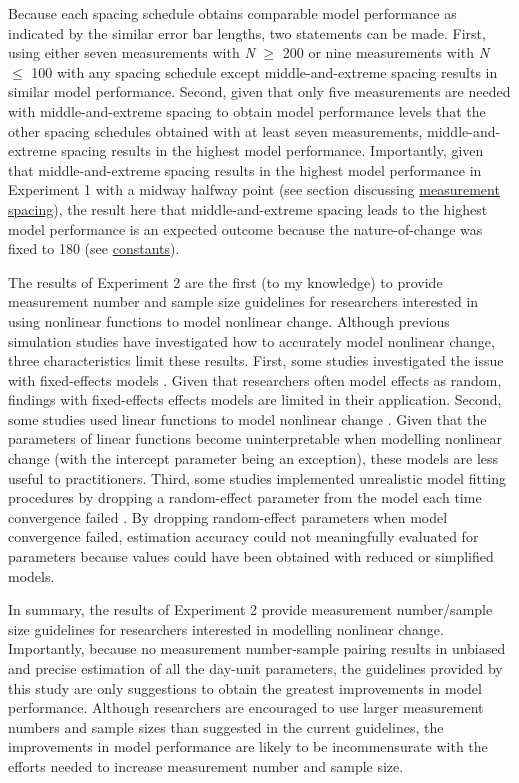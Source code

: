 \documentclass[
12pt, %
twoside,
english]{guelphthesis}
\begin{document}
\noindent Because each spacing schedule obtains comparable model performance as indicated by the similar error bar lengths, two statements can be made. First, using either seven measurements with \emph{N} \(\ge\) 200 or nine measurements with \emph{N} \(\le\) 100 with any spacing schedule except middle-and-extreme spacing results in similar model performance. Second, given that only five measurements are needed with middle-and-extreme spacing to obtain model performance levels that the other spacing schedules obtained with at least seven measurements, middle-and-extreme spacing results in the highest model performance. Importantly, given that middle-and-extreme spacing results in the highest model performance in Experiment 1 with a midway halfway point (see section discussing \protect\hyperlink{meas-placing}{measurement spacing}), the result here that middle-and-extreme spacing leads to the highest model performance is an expected outcome because the nature-of-change was fixed to 180 (see \protect\hyperlink{constants-exp2}{constants}).

The results of Experiment 2 are the first (to my knowledge) to provide measurement number and sample size guidelines for researchers interested in using nonlinear functions to model nonlinear change. Although previous simulation studies have investigated how to accurately model nonlinear change, three characteristics limit these results. First, some studies investigated the issue with fixed-effects models \autocite[e.g.,][]{finch2017}. Given that researchers often model effects as random, findings with fixed-effects effects models are limited in their application. Second, some studies used linear functions to model nonlinear change \autocites[e.g.,][]{fine2019,liu2022}. Given that the parameters of linear functions become uninterpretable when modelling nonlinear change (with the intercept parameter being an exception), these models are less useful to practitioners. Third, some studies implemented unrealistic model fitting procedures by dropping a random-effect parameter from the model each time convergence failed \autocite{finch2017}. By dropping random-effect parameters when model convergence failed, estimation accuracy could not meaningfully evaluated for parameters because values could have been obtained with reduced or simplified models.

In summary, the results of Experiment 2 provide measurement number/sample size guidelines for researchers interested in modelling nonlinear change. Importantly, because no measurement number-sample pairing results in unbiased and precise estimation of all the day-unit parameters, the guidelines provided by this study are only suggestions to obtain the greatest improvements in model performance. Although researchers are encouraged to use larger measurement numbers and sample sizes than suggested in the current guidelines, the improvements in model performance are likely to be incommensurate with the efforts needed to increase measurement number and sample size.
\end{document}
